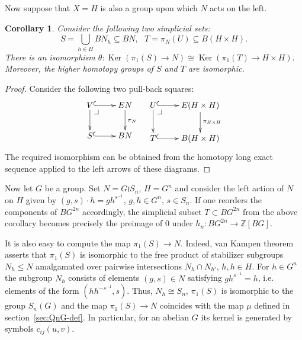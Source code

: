 \documentclass[oneside, 10pt]{amsart}
\makeatletter
\theoremstyle{plain}
\numberwithin{equation}{section}
\numberwithin{lemma}{section}
\newtheorem{cor}[lemma]{Corollary}
\theoremstyle{remark}
\theoremstyle{definition}
\DeclareMathOperator{\Ker}{Ker}
\newcommand{\ZZ}{\mathbb{Z}}
\newcommand{\pullbackcorner}[1][dr]{\save*!/#1-1.2pc/#1:(-1,1)@^{|-}\restore}
\makeatother
\begin{document}
Now suppose that $X=H$ is also a group upon which $N$ acts on the left.
\begin{cor} \label{cor:ker-iso}
Consider the following two simplicial sets:
\[ S = \bigcup\limits_{h\in H} BN_h \subseteq BN,\ \ \ T = \pi_N(U) \subseteq B(H \times H).\]
There is an isomorphism $\theta\colon \Ker(\pi_1(S) \to N) \cong \Ker(\pi_1(T) \to H \times H).$
Moreover, the higher homotopy groups of $S$ and $T$ are isomorphic. 
\end{cor}
\begin{proof}
Consider the following two pull-back squares:
\[ \xymatrix{ V  \ar@{^{(}->}[r] \ar[d] \pullbackcorner & \ar[d]^{\pi_N} EN \\
              S \ar@{^{(}->}[r] & BN } \ \ \ 
   \xymatrix{ U  \ar@{^{(}->}[r] \ar[d] \pullbackcorner & \ar[d]^{\pi_{H \times H}} E(H \times H) \\
              T \ar@{^{(}->}[r] & B(H \times H)}\] 
The required isomorphism can be obtained from the homotopy long exact sequence applied to the left arrows of these diagrams.\end{proof}

Now let $G$ be a group. Set $N = G \wr S_n$, $H = G^n$ and consider the left action of $N$ on $H$ given by $(g, s) \cdot h = gh^{s^{-1}}$, $g, h\in G^n$, $s\in S_n$.
If one reorders the components of $BG^{2n}$ accordingly, the simplicial subset $T \subset BG^{2n}$ from the above corollary
 becomes precisely the preimage of $0$ under $h_n \colon BG^{2n} \to \ZZ[BG]$.

It is also easy to compute the map $\pi_1(S) \to N$. Indeed, van Kampen theorem~\cite[Theorem~2.7]{May99} asserts that
$\pi_1(S)$ is isomorphic to the free product of stabilizer subgroups $N_{h} \leq N$ amalgamated over pairwise intersections $N_h \cap N_{h'}$, $h, h\in H$.
For $h \in G^n$ the subgroup $N_h$ consists of elements $(g, s) \in N$ satisfying $gh^{s^{-1}} = h$, i.e. elements of the form $(hh^{-s^{-1}}, s)$.
Thus, $N_h\cong S_n$, $\pi_1(S)$ is isomorphic to the group $S_n(G)$ and the map $\pi_1(S) \to N$ coincides with the map $\mu$ defined in section~\ref{sec:QnG-def}.
In particular, for an abelian $G$ its kernel is generated by symbols $c_{ij}(u, v)$.
\end{document}
